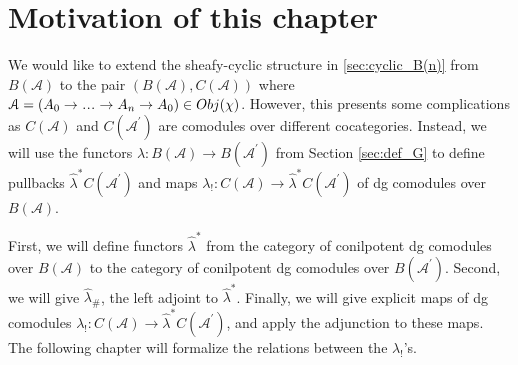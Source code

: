 \section{Motivation of this chapter}
We would like to extend the sheafy-cyclic 
structure in \ref{sec:cyclic_B(n)} from 
$B(\mathcal{A})$ to the pair $(B(\mathcal{A}), 
C(\mathcal{A}))$ where $\mathcal{A} = 
(A_0 \to \smdots \to A_n \to A_0) \in Obj(\chi)$. 
However, this presents some complications 
as $C(\mathcal{A})$ and $C(\mathcal{A^\prime})$ 
are comodules over different 
cocategories. Instead, we will use 
the functors $\hat{\lambda}: B(\mathcal{A}) 
\to B(\mathcal{A}^\prime)$ from Section 
\ref{sec:def_G} to
define pullbacks $\hat{\lambda}^*C(\mathcal{A}^\prime)$ 
and maps $\lambda_!: C(\mathcal{A}) 
\to \hat{\lambda}^*C(\mathcal{A}^\prime)$ 
of dg comodules over $B(\mathcal{A})$. 

First, we will define functors $\hat{\lambda}^*$ 
from the category of 
conilpotent dg comodules over $B(\mathcal{A})$ 
to the category of conilpotent dg comodules 
over $B(\mathcal{A}^\prime)$. 
Second, we will give $\hat{\lambda}_\#$, the left adjoint 
to $\hat{\lambda}^*$. Finally, we will 
give explicit maps of dg comodules 
$\lambda_!: C(\mathcal{A}) \to 
\hat{\lambda}^*C(\mathcal{A}^\prime)$, 
and apply the adjunction 
to these maps. The following chapter will formalize 
the relations between the $\lambda_!$'s.